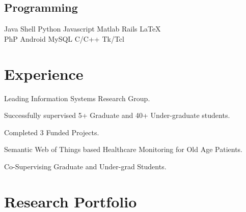 \documentclass[]{resume-openfont}
\begin{document}
\begin{minipage}[t]{0.33\textwidth}
\subsection{Programming}
Java \textbullet{} Shell \textbullet{} Python \textbullet{} Javascript \textbullet{} Matlab \textbullet{} Rails \textbullet{} \LaTeX \\
PhP \textbullet{} Android \textbullet{} MySQL \textbullet{} C/C++  \textbullet{} Tk/Tcl
\sectionsep

%
%

\end{minipage} 
\hfill
\begin{minipage}[t]{0.66\textwidth} 


\section{Experience}
\vspace{\topsep} %
\begin{tightemize}
\item Leading Information Systems Research Group.
\item Successfully supervised 5+ Graduate and 40+ Under-graduate students. 
\item Completed 3 Funded Projects. 
\end{tightemize}
\sectionsep

\vspace{\topsep}
\begin{tightemize}
\item Semantic Web of Things based Healthcare Monitoring for Old Age Patients.
\item Co-Supervising Graduate and Under-grad Students.
\end{tightemize}
\sectionsep


\section{Research Portfolio}


\end{minipage}
\end{document}
